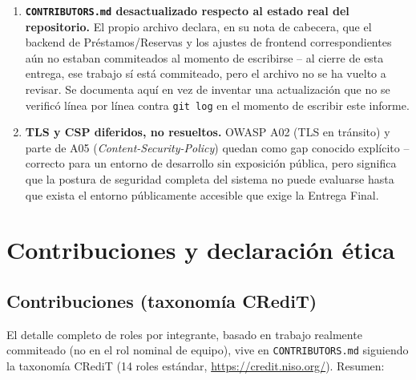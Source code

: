 \documentclass[12pt,a4paper]{article}
\begin{document}
\begin{enumerate}[leftmargin=1.2cm]
{    (hallazgo nuevo, no corregido).} Detectado al construir la colección
    Postman de esta entrega:
    \texttt{ReservacionService.crear()} no valida que \texttt{libroId}
    exista antes de guardar (a diferencia de \texttt{PrestamoController},
    que sí pasa por un procedimiento almacenado con validación
    \texttt{LB404}). Una reservación con un libro inexistente no
    responde 404: la restricción de llave foránea de PostgreSQL revienta
    como excepción no mapeada, y \texttt{GlobalExceptionHandler} la
    convierte en \textbf{500 Internal Server Error}. Verificado en vivo
    y documentado en \texttt{docs/postman/coleccion.json}, no corregido
    -- fuera del alcance del prompt que lo detectó.
  \item \textbf{\texttt{CONTRIBUTORS.md} desactualizado respecto al
    estado real del repositorio.} El propio archivo declara, en su nota
    de cabecera, que el backend de Préstamos/Reservas y los ajustes de
    frontend correspondientes aún no estaban commiteados al momento de
    escribirse -- al cierre de esta entrega, ese trabajo sí está
    commiteado, pero el archivo no se ha vuelto a revisar. Se documenta
    aquí en vez de inventar una actualización que no se verificó línea
    por línea contra \texttt{git log} en el momento de escribir este
    informe.
  \item \textbf{TLS y CSP diferidos, no resueltos.} OWASP A02 (TLS en
    tránsito) y parte de A05 (\emph{Content-Security-Policy}) quedan como
    gap conocido explícito -- correcto para un entorno de desarrollo sin
    exposición pública, pero significa que la postura de seguridad
    completa del sistema no puede evaluarse hasta que exista el entorno
    públicamente accesible que exige la Entrega Final.
\end{enumerate}

\section{Contribuciones y declaración ética}

\subsection{Contribuciones (taxonomía CRediT)}

El detalle completo de roles por integrante, basado en trabajo
realmente commiteado (no en el rol nominal de equipo), vive en
\texttt{CONTRIBUTORS.md} siguiendo la taxonomía CRediT (14 roles
estándar, \url{https://credit.niso.org/}). Resumen:
\end{document}
